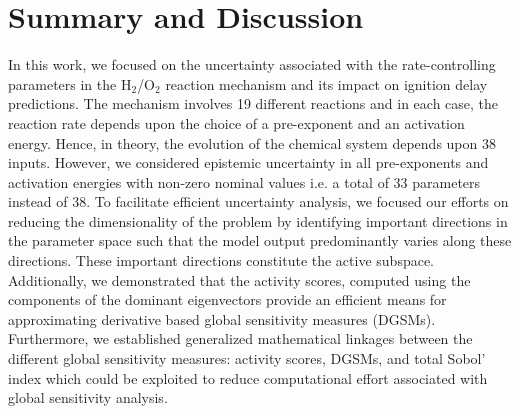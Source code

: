 \section{Summary and Discussion}
\label{sec:conc}

%
 
In this work, we focused on the uncertainty associated with the
rate-controlling parameters in the H$_2$/O$_2$ reaction mechanism and its
impact on ignition delay predictions. The mechanism involves 19 different
reactions and in each case, the reaction rate depends upon the choice of a
pre-exponent and an activation energy. Hence, in theory, the evolution of the
chemical system depends upon 38 inputs. However, we considered 
epistemic uncertainty in all pre-exponents and activation energies with non-zero
nominal values i.e. a total of 33 parameters instead of 38.  
To facilitate efficient uncertainty analysis, we focused our efforts on
reducing the dimensionality of the problem by identifying important directions
in the parameter space such that the model output 
predominantly varies along these directions. These important directions
constitute the active subspace. Additionally, we demonstrated that the activity scores,
computed using the components of the dominant eigenvectors provide an efficient
means for approximating derivative based global sensitivity measures (DGSMs).
Furthermore, we established generalized mathematical linkages between the
different global sensitivity measures: activity scores, DGSMs, and total Sobol'
index which could be exploited to reduce computational effort associated with
global sensitivity analysis. 
 

